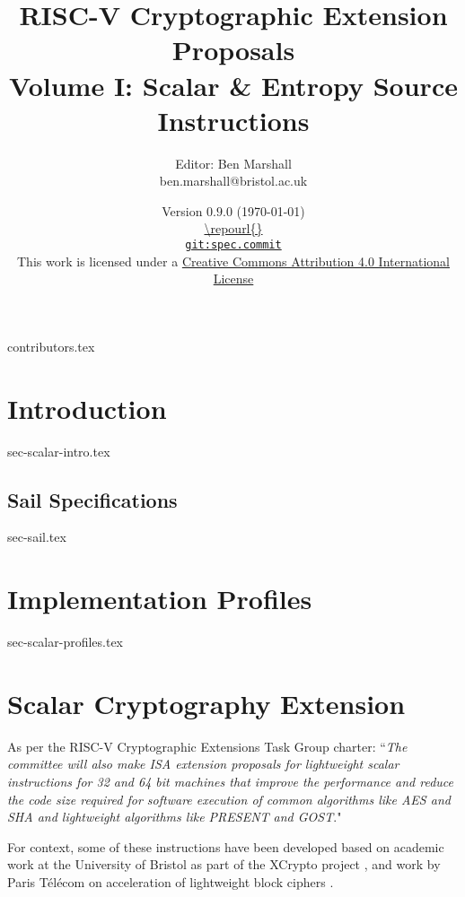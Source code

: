 \documentclass[11pt]{article}
\title{RISC-V Cryptographic Extension Proposals\\Volume I: Scalar \& Entropy Source Instructions}
\author{Editor: Ben Marshall\\ben.marshall@bristol.ac.uk}
\date{Version $0.9.0$ (\today) \\
\medskip
\url{\repourl{}} \\
\href{\repourl{}}{
{\small \tt git:{spec.commit}}} \\
\bigskip
{\small
This work is licensed under a
\href{http://creativecommons.org/licenses/by/4.0/}{Creative Commons Attribution 4.0 International License}
}
}
\begin{document}

\maketitle

{contributors.tex}

\tableofcontents




\newpage
\section{Introduction}
\label{sec:intro}
{sec-scalar-intro.tex}

\subsection{Sail Specifications}
\label{sec:sail}
{sec-sail.tex}

\newpage
\section{Implementation Profiles}
\label{sec:profiles}
{sec-scalar-profiles.tex}

\clearpage
\section{Scalar Cryptography Extension}
\label{sec:scalar}

As per the RISC-V Cryptographic Extensions Task Group charter:
``{\em The committee will also make ISA extension proposals for lightweight
scalar instructions for 32 and 64 bit machines that improve the performance
and reduce the code size required for software execution of common algorithms
like AES and SHA and lightweight algorithms like PRESENT and GOST}."

\bigskip

For context, some of these instructions have been developed based on academic
work at the University of Bristol as part of the XCrypto project
\cite{MPP:19},
and work by
Paris T\'{e}l\'{e}com on acceleration of lightweight block ciphers
\cite{TGMGD:19}.


\end{document}
